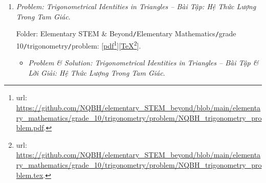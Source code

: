 \documentclass[12pt]{article}
\begin{document}
\begin{enumerate}
\begin{itemize}
		Folder: {\sf Elementary STEM \& Beyond{\tt/}Elementary Mathematics{\tt/}grade 10{\tt/}function graph{\tt/}solution}: [\href{https://github.com/NQBH/elementary_STEM_beyond/blob/main/elementary_mathematics/grade_10/function_graph/solution/NQBH_function_graph_solution.pdf}{pdf}\footnote{{\sc url}: \url{https://github.com/NQBH/elementary_STEM_beyond/blob/main/elementary_mathematics/grade_10/function_graph/solution/NQBH_function_graph_solution.pdf}.}][\href{https://github.com/NQBH/elementary_STEM_beyond/blob/main/elementary_mathematics/grade_10/function_graph/solution/NQBH_function_graph_solution.tex}{\TeX}\footnote{{\sc url}: \url{https://github.com/NQBH/elementary_STEM_beyond/blob/main/elementary_mathematics/grade_10/function_graph/solution/NQBH_function_graph_solution.tex}.}].
	\end{itemize}
	\item {\it Problem: Trigonometrical Identities in Triangles -- Bài Tập: Hệ Thức Lượng Trong Tam Giác}.
	
	Folder: {\sf Elementary STEM \& Beyond{\tt/}Elementary Mathematics{\tt/}grade 10{\tt/}trigonometry{\tt/}problem}: [\href{https://github.com/NQBH/elementary_STEM_beyond/blob/main/elementary_mathematics/grade_10/trigonometry/problem/NQBH_trigonometry_problem.pdf}{pdf}\footnote{{\sc url}: \url{https://github.com/NQBH/elementary_STEM_beyond/blob/main/elementary_mathematics/grade_10/trigonometry/problem/NQBH_trigonometry_problem.pdf}.}][\href{https://github.com/NQBH/elementary_STEM_beyond/blob/main/elementary_mathematics/grade_10/trigonometry/problem/NQBH_trigonometry_problem.tex}{\TeX}\footnote{{\sc url}: \url{https://github.com/NQBH/elementary_STEM_beyond/blob/main/elementary_mathematics/grade_10/trigonometry/problem/NQBH_trigonometry_problem.tex}.}].
	\begin{itemize}
		\item {\it Problem \& Solution: Trigonometrical Identities in Triangles -- Bài Tập \& Lời Giải: Hệ Thức Lượng Trong Tam Giác}.
		

\end{itemize}
\end{enumerate}
\end{document}
